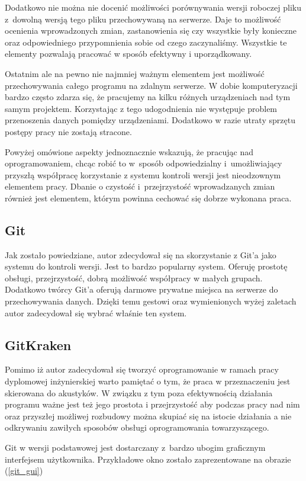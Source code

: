 \documentclass[eng,printmode]{mgr}
\begin{document}
Dodatkowo nie można nie docenić możliwości porównywania wersji roboczej pliku z~dowolną wersją tego pliku przechowywaną na serwerze. Daje to możliwość ocenienia wprowadzonych zmian, zastanowienia się czy wszystkie były konieczne oraz odpowiedniego przypomnienia sobie od czego zaczynaliśmy. Wszystkie te elementy pozwalają pracować w sposób efektywny i uporządkowany.

Ostatnim ale na pewno nie najmniej ważnym elementem jest możliwość przechowywania całego programu na zdalnym serwerze. W dobie komputeryzacji bardzo często zdarza się, że pracujemy na kilku różnych urządzeniach nad tym samym projektem. Korzystając z tego udogodnienia nie występuje problem przenoszenia danych pomiędzy urządzeniami. Dodatkowo w razie utraty sprzętu postępy pracy nie zostają stracone.
 
Powyżej omówione aspekty jednoznacznie wskazują, że pracując nad oprogramowaniem, chcąc robić to w~sposób odpowiedzialny i~umożliwiający przyszłą współpracę korzystanie z systemu kontroli wersji jest nieodzownym elementem pracy. Dbanie o czystość i~przejrzystość wprowadzanych zmian również jest elementem, którym powinna cechować się dobrze wykonana praca. 

\subsection{Git}
Jak zostało powiedziane, autor zdecydował się na skorzystanie z Git'a jako systemu do kontroli wersji. Jest to bardzo popularny system. Oferuję prostotę obsługi, przejrzystość, dobrą możliwość współpracy w małych grupach. Dodatkowo twórcy Git'a oferują darmowe prywatne miejsca na serwerze do przechowywania danych. Dzięki temu gestowi oraz wymienionych wyżej zaletach autor zadecydował się wybrać właśnie ten system. 

\subsection{GitKraken}
Pomimo iż autor zadecydował się tworzyć oprogramowanie w ramach pracy dyplomowej inżynierskiej warto pamiętać o tym, że praca w przeznaczeniu jest skierowana do akustyków. W związku z tym poza efektywnością działania programu ważne jest też jego prostota i przejrzystość aby podczas pracy nad nim oraz przyszłej możliwej rozbudowy można skupiać się na istocie działania a nie odkrywaniu zawiłych sposobów obsługi oprogramowania towarzyszącego.

Git w wersji podstawowej jest dostarczany z~bardzo ubogim graficznym interfejsem użytkownika. Przykładowe okno zostało zaprezentowane na obrazie (\ref{git_gui})
\end{document}
